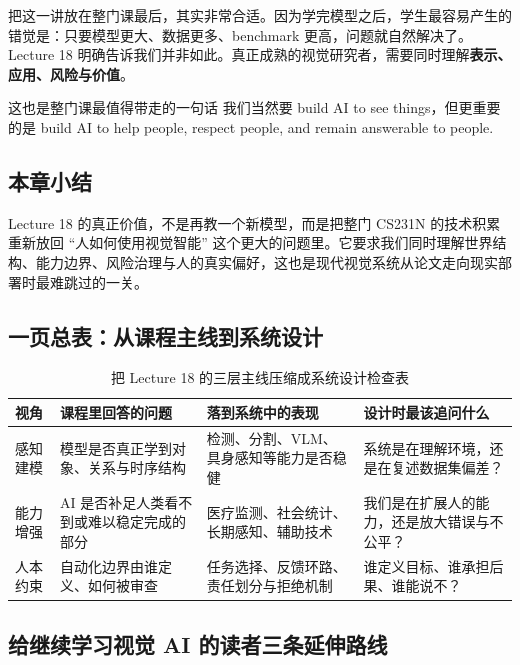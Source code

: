 \documentclass[a4paper]{article}
\begin{document}
把这一讲放在整门课最后，其实非常合适。因为学完模型之后，学生最容易产生的错觉是：只要模型更大、数据更多、benchmark 更高，问题就自然解决了。Lecture 18 明确告诉我们并非如此。真正成熟的视觉研究者，需要同时理解\textbf{表示、应用、风险与价值}。

\begin{warningbox}{这也是整门课最值得带走的一句话}
我们当然要 build AI to see things，但更重要的是 build AI to help people, respect people, and remain answerable to people.
\end{warningbox}

\subsection{本章小结}
Lecture 18 的真正价值，不是再教一个新模型，而是把整门 CS231N 的技术积累重新放回 ``人如何使用视觉智能'' 这个更大的问题里。它要求我们同时理解世界结构、能力边界、风险治理与人的真实偏好，这也是现代视觉系统从论文走向现实部署时最难跳过的一关。

\subsection{一页总表：从课程主线到系统设计}

\begin{table}[H]
\centering
\small
\renewcommand{\arraystretch}{1.18}
\begin{tabular}{p{2.8cm}p{3.4cm}p{3.6cm}p{4.0cm}}
\toprule
\textbf{视角} & \textbf{课程里回答的问题} & \textbf{落到系统中的表现} & \textbf{设计时最该追问什么} \\
\midrule
感知建模 & 模型是否真正学到对象、关系与时序结构 & 检测、分割、VLM、具身感知等能力是否稳健 & 系统是在理解环境，还是在复述数据集偏差？ \\
能力增强 & AI 是否补足人类看不到或难以稳定完成的部分 & 医疗监测、社会统计、长期感知、辅助技术 & 我们是在扩展人的能力，还是放大错误与不公平？ \\
人本约束 & 自动化边界由谁定义、如何被审查 & 任务选择、反馈环路、责任划分与拒绝机制 & 谁定义目标、谁承担后果、谁能说不？ \\
\bottomrule
\end{tabular}
\caption{把 Lecture 18 的三层主线压缩成系统设计检查表}
\end{table}

\subsection{给继续学习视觉 AI 的读者三条延伸路线}
\end{document}
